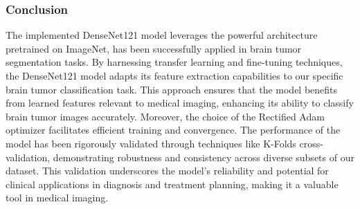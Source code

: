 

\subsubsection{Conclusion}

The implemented DenseNet121 model leverages the powerful architecture pretrained on ImageNet, has been successfully applied in brain tumor segmentation tasks. By harnessing transfer learning and fine-tuning techniques, the DenseNet121 model adapts its feature extraction capabilities to our specific brain tumor classification task. This approach ensures that the model benefits from learned features relevant to medical imaging, enhancing its ability to classify brain tumor images accurately. Moreover, the choice of the Rectified Adam optimizer facilitates efficient training and convergence. The performance of the model has been rigorously validated through techniques like K-Folds cross-validation, demonstrating robustness and consistency across diverse subsets of our dataset. This validation underscores the model's reliability and potential for clinical applications in diagnosis and treatment planning, making it a valuable tool in medical imaging.
